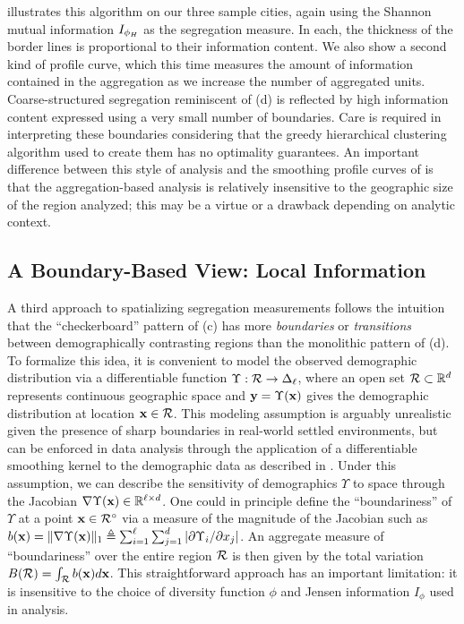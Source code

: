    illustrates this algorithm on our three sample cities, again using the Shannon mutual information $I_{\phi_H}$ as the segregation measure.
  In each, the thickness of the border lines is proportional to their information content. 
  We also show a second kind of profile curve, which this time measures the amount of information contained in the aggregation as we increase the number of aggregated units.
  Coarse-structured segregation reminiscent of (d) is reflected by high information content expressed using a very small number of boundaries. 
  Care is required in interpreting these boundaries considering that the greedy hierarchical clustering algorithm used to create them has no optimality guarantees. 
  An important difference between this style of analysis and the smoothing profile curves of  is that the aggregation-based analysis is relatively insensitive to the geographic size of the region analyzed; this may be a virtue or a drawback depending on analytic context. 
  
  \subsection{A Boundary-Based View: Local Information}
  
    A third approach to spatializing segregation measurements follows the intuition that the ``checkerboard'' pattern of (c) has more \emph{boundaries} or \emph{transitions} between demographically contrasting regions than the monolithic pattern of (d).
    To formalize this idea, it is convenient to model the observed demographic distribution via a differentiable function $\Upsilon: \mathcal{R} \rightarrow \Delta_{\ell}$, where an open set $\mathcal{R} \subset \mathbb{R}^d$ represents continuous geographic space and $\mathbf{y} = \Upsilon(\mathbf{x})$ gives the demographic distribution at location $\mathbf{x} \in \mathcal{R}$.
    This modeling assumption is arguably unrealistic given the presence of sharp boundaries in real-world settled environments, but can be enforced in data analysis through the application of a differentiable smoothing kernel to the demographic data as described in .
    Under this assumption, we can describe the sensitivity of demographics $\Upsilon$ to space through the Jacobian $\nabla \Upsilon(\mathbf{x}) \in \mathbb{R}^{\ell \times d}$.
    One could in principle define the ``boundariness'' of $\Upsilon$ at a point $\mathbf{x} \in \mathcal{R}^{\circ}$ via a measure of the magnitude of the Jacobian such as $b(\mathbf{x}) = \lVert \nabla \Upsilon(\mathbf{x}) \rVert_1 \triangleq \sum_{i=1}^{\ell} \sum_{j=1}^d \left| \partial \Upsilon_i / \partial x_j \right|$. 
    An aggregate measure of ``boundariness''  over the entire region $\mathcal{R}$ is then given by the total variation $B(\mathcal{R}) = \int_{\mathcal{R}} b(\mathbf{x}) d\mathbf{x}$.
    This straightforward approach has an important limitation: it is insensitive to the choice of diversity function $\phi$ and Jensen information $I_\phi$ used in analysis. 

